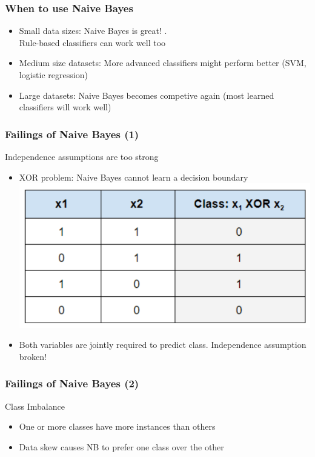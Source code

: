 \begin{frame}
\frametitle{When to use Naive Bayes}
\begin{itemize}[<+->]
\item Small data sizes: Naive Bayes is great! .
 \\ Rule-based classifiers can work well too
\item Medium size datasets: More advanced classifiers might perform better (SVM, logistic regression)
\item Large datasets: Naive Bayes becomes competive again (most learned classifiers will work well)
\end{itemize}
\end{frame}

\begin{frame}
\frametitle{Failings of Naive Bayes (1)}
\begin{block}{Independence assumptions are too strong}
\begin{itemize}[<+->]
\item XOR problem: Naive Bayes cannot learn a decision boundary
\pause
\includegraphics[scale=0.25]{figures/classifiers/xor.png}
\item Both variables are jointly required to predict class. Independence assumption broken!
\end{itemize}
\end{block}
\end{frame}

\begin{frame}
\frametitle{Failings of Naive Bayes (2)}
\begin{block}{Class Imbalance}
\begin{itemize}[<+->]
\item One or more classes have more instances than others
\item Data skew causes NB to prefer one class over the other
\end{itemize}
\end{block}
\end{frame}


